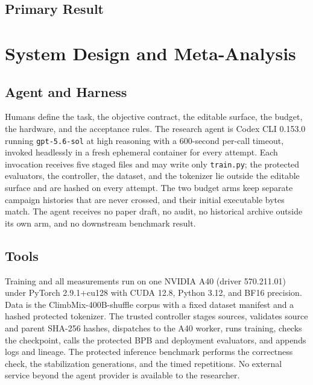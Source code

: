\documentclass{article}
\begin{document}
\subsection{Primary Result}

\label{partoneend}


\clearpage
\section{System Design and Meta-Analysis}\label{parttwo}

\subsection{Agent and Harness}
Humans define the task, the objective contract, the editable surface, the budget, the hardware, and the acceptance rules. The research agent is Codex CLI 0.153.0 running \texttt{gpt-5.6-sol} at high reasoning with a 600-second per-call timeout, invoked headlessly in a fresh ephemeral container for every attempt. Each invocation receives five staged files and may write only \texttt{train.py}; the protected evaluators, the controller, the dataset, and the tokenizer lie outside the editable surface and are hashed on every attempt. The two budget arms keep separate campaign histories that are never crossed, and their initial executable bytes match. The agent receives no paper draft, no audit, no historical archive outside its own arm, and no downstream benchmark result.

\subsection{Tools}
Training and all measurements run on one NVIDIA A40 (driver 570.211.01) under PyTorch 2.9.1+cu128 with CUDA 12.8, Python 3.12, and BF16 precision. Data is the ClimbMix-400B-shuffle corpus with a fixed dataset manifest and a hashed protected tokenizer. The trusted controller stages sources, validates source and parent SHA-256 hashes, dispatches to the A40 worker, runs training, checks the checkpoint, calls the protected BPB and deployment evaluators, and appends logs and lineage. The protected inference benchmark performs the correctness check, the stabilization generations, and the timed repetitions. No external service beyond the agent provider is available to the researcher.
\end{document}
